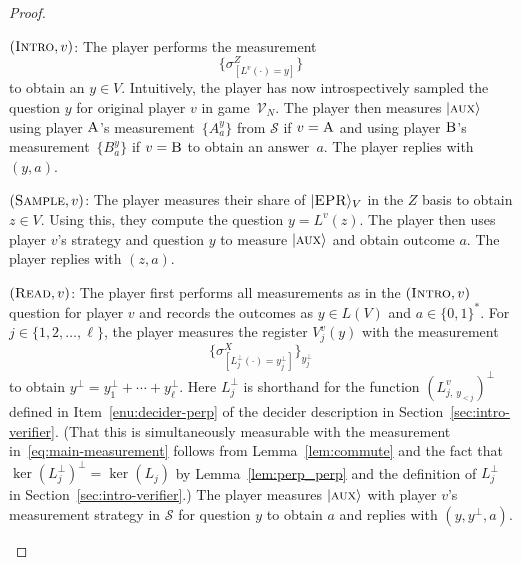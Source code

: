 \documentclass[11pt]{article}
\theoremstyle{definition}
\newcommand{\ket}[1]{|#1\rangle}
\newcommand{\verifier}{\mathcal{V}}
\newcommand{\strategy}{\mathscr{S}}
\newcommand{\labelstyle}[1]{\ensuremath{\textsc{#1}}\xspace}
\newcommand{\EPR}{\labelstyle{EPR}}
\newcommand{\aux}{\labelstyle{aux}}
\newcommand{\trole}{\ensuremath{v}} %
\newcommand{\alice}{\labelstyle{A}}
\newcommand{\bob}{\labelstyle{B}}
\newcommand{\typestyle}[1]{\ensuremath{\textsc{#1}}\xspace}
\newcommand{\Sample}{\typestyle{Sample}}
\newcommand{\Read}{\typestyle{Read}}
\newcommand{\Introspect}{\typestyle{Intro}}
\begin{document}
\begin{proof}
  \begin{description}
  \item $(\Introspect, \trole)$: The player performs the measurement
    \begin{equation}
      \label{eq:main-measurement}
      \bigl\{ \sigma^Z_{[L^\trole(\cdot) = y]} \bigr\}
    \end{equation}
    to obtain an $y\in V$.
    Intuitively, the player has now introspectively sampled the question $y$ for
    original player $\trole$ in game~$\verifier_N$.
    The player then measures $\ket{\aux}$ using player $\alice$'s
    measurement~$\{A^y_a\}$ from $\strategy$ if $v = \alice$ and using player
    $\bob$'s measurement~$\{B^y_a\}$ if $\trole = \bob$ to obtain an answer~$a$.
    The player replies with $(y,a)$.
  \item $(\Sample, \trole)$: The player measures their share of $\ket{\EPR}_V$
    in the $Z$ basis to obtain $z \in V$.
    Using this, they compute the question $y = L^\trole(z)$.
    The player then uses player $v$'s strategy and question $y$ to measure
    $\ket{\aux}$ and obtain outcome $a$.
    The player replies with $(z, a)$.
  \item $(\Read, \trole)$: The player first performs all measurements as in the
    $(\Introspect, \trole)$ question for player $\trole$ and records the
    outcomes as $y\in L(V)$ and $a\in\{0,1\}^*$.
    For $j\in \{1, 2, \ldots, \ell\}$, the player measures the register
    $V^\trole_j(y)$ with the measurement
    \begin{equation}
      \label{eq:perp-measurement}
      \big\{\sigma^X_{[L_j^\perp (\cdot) = y_j^\perp]} \big\}_{y_j^\perp}
    \end{equation}
    to obtain $y^\perp = y_1^\perp + \cdots + y_\ell^\perp$.
    Here $L_j^\perp$ is shorthand for the function $(L^{\trole}_{j,\,
      y_{<j}})^\perp$ defined in Item~\ref{enu:decider-perp} of the decider
    description in Section~\ref{sec:intro-verifier}.
    (That this is simultaneously measurable with the measurement
    in~\eqref{eq:main-measurement} follows from Lemma~\ref{lem:commute} and the
    fact that $\ker(L^\perp_{j})^\perp = \ker(L_{j})$ by
    Lemma~\ref{lem:perp_perp} and the definition of $L^\perp_{j}$ in
    Section~\ref{sec:intro-verifier}.)
    The player measures $\ket{\aux}$ with player $\trole$'s measurement strategy
    in $\strategy$ for question $y$ to obtain $a$ and replies with
    $(y,y^\perp,a)$.


\end{description}
\end{proof}
\end{document}
